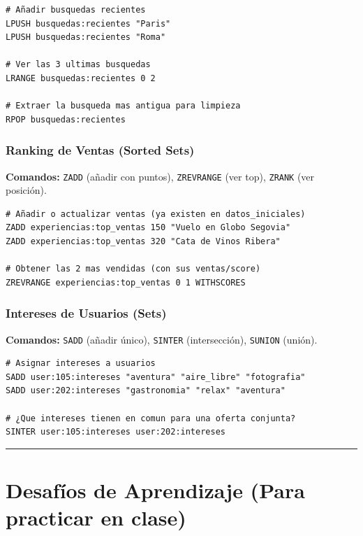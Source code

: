 \documentclass[12pt,a4paper]{article}
\begin{document}
\begin{lstlisting}
# Añadir busquedas recientes
LPUSH busquedas:recientes "Paris"
LPUSH busquedas:recientes "Roma"

# Ver las 3 ultimas busquedas
LRANGE busquedas:recientes 0 2

# Extraer la busqueda mas antigua para limpieza
RPOP busquedas:recientes
\end{lstlisting}

\hypertarget{e.-rankings-y-leaderboards-sorted-sets}{%
\subsubsection{Ranking de Ventas (Sorted
Sets)}\label{e.-rankings-y-leaderboards-sorted-sets}}

\textbf{Comandos:} \texttt{ZADD} (añadir con puntos),
\texttt{ZREVRANGE} (ver top),
\texttt{ZRANK} (ver posición).

\begin{lstlisting}
# Añadir o actualizar ventas (ya existen en datos_iniciales)
ZADD experiencias:top_ventas 150 "Vuelo en Globo Segovia"
ZADD experiencias:top_ventas 320 "Cata de Vinos Ribera"

# Obtener las 2 mas vendidas (con sus ventas/score)
ZREVRANGE experiencias:top_ventas 0 1 WITHSCORES
\end{lstlisting}

\hypertarget{f.-etiquetas-y-conjuntos-sets}{%
\subsubsection{Intereses de Usuarios
(Sets)}\label{f.-etiquetas-y-conjuntos-sets}}

\textbf{Comandos:} \texttt{SADD} (añadir único),
\texttt{SINTER} (intersección),
\texttt{SUNION} (unión).

\begin{lstlisting}
# Asignar intereses a usuarios
SADD user:105:intereses "aventura" "aire_libre" "fotografia"
SADD user:202:intereses "gastronomia" "relax" "aventura"

# ¿Que intereses tienen en comun para una oferta conjunta?
SINTER user:105:intereses user:202:intereses
\end{lstlisting}

\begin{center}\rule{0.5\linewidth}{0.5pt}\end{center}

\section{Desafíos de Aprendizaje (Para practicar en clase)}
\end{document}
